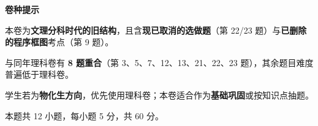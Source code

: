 

\begin{gknotice}
\textbf{ 卷种提示}

本卷为\textbf{文理分科时代的旧结构}，且含\textbf{现已取消的选做题}（第 22/23 题）与\textbf{已删除的程序框图}考点（第 9 题）。

与同年理科卷有 \textbf{8 题重合}（第 3、5、7、12、13、21、22、23 题），其余题目难度普遍低于理科卷。

学生若为\textbf{物化生方向}，优先使用理科卷；本卷适合作为\textbf{基础巩固}或按知识点抽题。
\end{gknotice}

\par\medskip


\begin{gktip}
本题共 12 小题，每小题 5 分，共 60 分。
\end{gktip}

